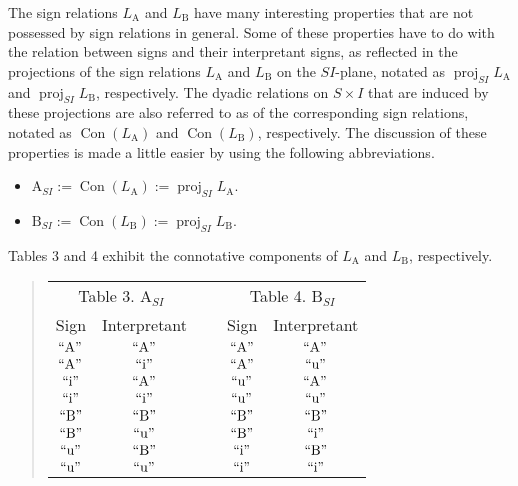 \documentclass[12pt]{article}
\begin{document}
The sign relations $L_{\mathrm{A}}$ and $L_{\mathrm{B}}$ have many interesting properties that are not possessed by sign relations in general.  Some of these properties have to do with the relation between signs and their interpretant signs, as reflected in the projections of the sign relations $L_{\mathrm{A}}$ and $L_{\mathrm{B}}$ on the $SI$-plane, notated as $\operatorname{proj}_{SI}L_{\mathrm{A}}$ and $\operatorname{proj}_{SI}L_{\mathrm{B}}$, respectively.  The dyadic relations on $S \times I$ that are induced by these projections are also referred to as \textit{} of the corresponding sign relations, notated as $\operatorname{Con}(L_{\mathrm{A}})$ and $\operatorname{Con}(L_{\mathrm{B}})$, respectively.  The discussion of these properties is made a little easier by using the following abbreviations.

\begin{itemize}
\item
$\mathrm{A}_{SI} := \operatorname{Con}(L_{\mathrm{A}}) := \operatorname{proj}_{SI}L_{\mathrm{A}}.$
\item
$\mathrm{B}_{SI} := \operatorname{Con}(L_{\mathrm{B}}) := \operatorname{proj}_{SI}L_{\mathrm{B}}.$
\end{itemize}

Tables 3 and 4 exhibit the connotative components of $L_{\mathrm{A}}$ and $L_{\mathrm{B}}$, respectively.

\begin{quote}\begin{tabular}{|c|c|p{2cm}|c|c|}
\multicolumn{2}{c}{Table 3.  $\mathrm{A}_{SI}$} &
\multicolumn{1}{c}{~} &
\multicolumn{2}{c}{Table 4.  $\mathrm{B}_{SI}$} \\
\cline{1-2}\cline{4-5}
Sign & Interpretant & & Sign & Interpretant \\
\cline{1-2}\cline{4-5}
$\mathrm{``A"}$ & $\mathrm{``A"}$ &&
$\mathrm{``A"}$ & $\mathrm{``A"}$ \\
\cline{1-2}\cline{4-5}
$\mathrm{``A"}$ & $\mathrm{``i"}$ &&
$\mathrm{``A"}$ & $\mathrm{``u"}$ \\
\cline{1-2}\cline{4-5}
$\mathrm{``i"}$ & $\mathrm{``A"}$ &&
$\mathrm{``u"}$ & $\mathrm{``A"}$ \\
\cline{1-2}\cline{4-5}
$\mathrm{``i"}$ & $\mathrm{``i"}$ &&
$\mathrm{``u"}$ & $\mathrm{``u"}$ \\
\cline{1-2}\cline{4-5}
$\mathrm{``B"}$ & $\mathrm{``B"}$ &&
$\mathrm{``B"}$ & $\mathrm{``B"}$ \\
\cline{1-2}\cline{4-5}
$\mathrm{``B"}$ & $\mathrm{``u"}$ &&
$\mathrm{``B"}$ & $\mathrm{``i"}$ \\
\cline{1-2}\cline{4-5}
$\mathrm{``u"}$ & $\mathrm{``B"}$ &&
$\mathrm{``i"}$ & $\mathrm{``B"}$ \\
\cline{1-2}\cline{4-5}
$\mathrm{``u"}$ & $\mathrm{``u"}$ &&
$\mathrm{``i"}$ & $\mathrm{``i"}$ \\
\cline{1-2}\cline{4-5}
\end{tabular}\end{quote}
\end{document}
